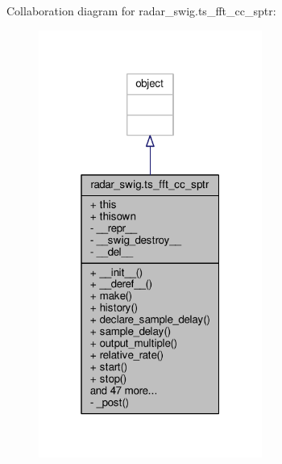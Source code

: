 Collaboration diagram for radar\+\_\+swig.\+ts\+\_\+fft\+\_\+cc\+\_\+sptr\+:
\nopagebreak
\begin{figure}[H]
\begin{center}
\leavevmode
\includegraphics[width=208pt]{db/de6/classradar__swig_1_1ts__fft__cc__sptr__coll__graph}
\end{center}
\end{figure}
